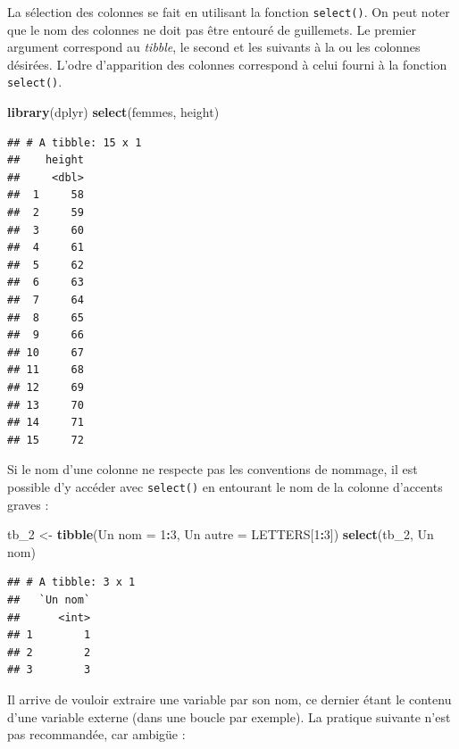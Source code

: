\documentclass[
  11pt,
]{book}
\newenvironment{Shaded}{\begin{snugshade}}{\end{snugshade}}
\newcommand{\DataTypeTok}[1]{\textcolor[rgb]{0.13,0.29,0.53}{#1}}
\newcommand{\DecValTok}[1]{\textcolor[rgb]{0.00,0.00,0.81}{#1}}
\newcommand{\KeywordTok}[1]{\textcolor[rgb]{0.13,0.29,0.53}{\textbf{#1}}}
\newcommand{\NormalTok}[1]{#1}
\newcommand{\OperatorTok}[1]{\textcolor[rgb]{0.81,0.36,0.00}{\textbf{#1}}}
\newcommand{\StringTok}[1]{\textcolor[rgb]{0.31,0.60,0.02}{#1}}
\numberwithin{equation}{section}
\numberwithin{countremarque}{section}
\begin{document}
La sélection des colonnes se fait en utilisant la fonction \texttt{select()}. On peut noter que le nom des colonnes ne doit pas être entouré de guillemets. Le premier argument correspond au \emph{tibble}, le second et les suivants à la ou les colonnes désirées. L'odre d'apparition des colonnes correspond à celui fourni à la fonction \texttt{select()}.

\begin{Shaded}
\begin{Highlighting}[]
\KeywordTok{library}\NormalTok{(dplyr)}
\KeywordTok{select}\NormalTok{(femmes, height)}
\end{Highlighting}
\end{Shaded}

\begin{lstlisting}
## # A tibble: 15 x 1
##    height
##     <dbl>
##  1     58
##  2     59
##  3     60
##  4     61
##  5     62
##  6     63
##  7     64
##  8     65
##  9     66
## 10     67
## 11     68
## 12     69
## 13     70
## 14     71
## 15     72
\end{lstlisting}

Si le nom d'une colonne ne respecte pas les conventions de nommage, il est possible d'y accéder avec \texttt{select()} en entourant le nom de la colonne d'accents graves :

\begin{Shaded}
\begin{Highlighting}[]
\NormalTok{tb\_}\DecValTok{2}\NormalTok{ \textless{}{-}}\StringTok{ }\KeywordTok{tibble}\NormalTok{(}\StringTok{\textasciigrave{}}\DataTypeTok{Un nom}\StringTok{\textasciigrave{}}\NormalTok{ =}\StringTok{ }\DecValTok{1}\OperatorTok{:}\DecValTok{3}\NormalTok{, }\StringTok{\textasciigrave{}}\DataTypeTok{Un autre}\StringTok{\textasciigrave{}}\NormalTok{ =}\StringTok{ }\NormalTok{LETTERS[}\DecValTok{1}\OperatorTok{:}\DecValTok{3}\NormalTok{])}
\KeywordTok{select}\NormalTok{(tb\_}\DecValTok{2}\NormalTok{, }\StringTok{\textasciigrave{}}\DataTypeTok{Un nom}\StringTok{\textasciigrave{}}\NormalTok{)}
\end{Highlighting}
\end{Shaded}

\begin{lstlisting}
## # A tibble: 3 x 1
##   `Un nom`
##      <int>
## 1        1
## 2        2
## 3        3
\end{lstlisting}

Il arrive de vouloir extraire une variable par son nom, ce dernier étant le contenu d'une variable externe (dans une boucle par exemple). La pratique suivante n'est pas recommandée, car ambigüe :
\end{document}
